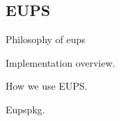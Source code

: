 \subsection{EUPS}\label{sec:eups}

Philosophy of eups

Implementation overview.

How we use EUPS.

Eupspkg.
